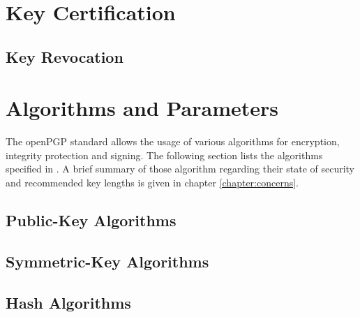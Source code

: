 


\section{Key Certification}


\subsection{Key Revocation}


\section{Algorithms and Parameters}



The openPGP standard allows the usage of various algorithms for encryption, integrity protection and signing. The following section lists the algorithms specified in \citep[section 9]{RFC4880}. A brief summary of those algorithm regarding their state of security and recommended key lengths is given in chapter \ref{chapter:concerns}.

\subsection{Public-Key Algorithms}

\subsection{Symmetric-Key Algorithms}

\subsection{Hash Algorithms}

